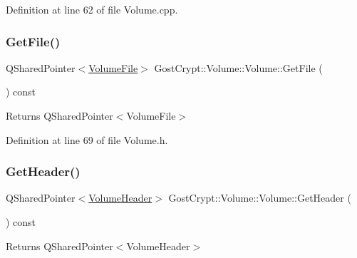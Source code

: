 Definition at line 62 of file Volume.\+cpp.

\mbox{\label{class_gost_crypt_1_1_volume_1_1_volume_a7bab5973777d5d3c7ae24450c5ee12ee}} 
\subsubsection{\texorpdfstring{Get\+File()}{GetFile()}}
{\footnotesize\ttfamily Q\+Shared\+Pointer$<$\hyperlink{class_gost_crypt_1_1_volume_1_1_volume_file}{Volume\+File}$>$ Gost\+Crypt\+::\+Volume\+::\+Volume\+::\+Get\+File (\begin{DoxyParamCaption}{ }\end{DoxyParamCaption}) const\hspace{0.3cm}{\ttfamily [inline]}}

\begin{DoxyReturn}{Returns}
Q\+Shared\+Pointer$<$\+Volume\+File$>$ 
\end{DoxyReturn}


Definition at line 69 of file Volume.\+h.

\mbox{\label{class_gost_crypt_1_1_volume_1_1_volume_a6083fe6529f9eba59f5136c6a95b855e}} 
\subsubsection{\texorpdfstring{Get\+Header()}{GetHeader()}}
{\footnotesize\ttfamily Q\+Shared\+Pointer$<$\hyperlink{class_gost_crypt_1_1_volume_1_1_volume_header}{Volume\+Header}$>$ Gost\+Crypt\+::\+Volume\+::\+Volume\+::\+Get\+Header (\begin{DoxyParamCaption}{ }\end{DoxyParamCaption}) const\hspace{0.3cm}{\ttfamily [inline]}}

\begin{DoxyReturn}{Returns}
Q\+Shared\+Pointer$<$\+Volume\+Header$>$ 
\end{DoxyReturn}


